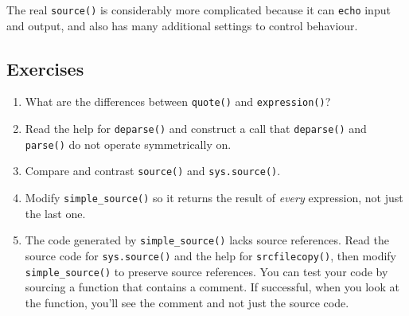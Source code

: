 \begin{Shaded}
\begin{Highlighting}[]
\StringTok{ } \NormalTok{()) \{}
  \NormalTok{(}
  \NormalTok{(}

\StringTok{ } \NormalTok{)}
\StringTok{ }\NormalTok{(}

\StringTok{ }
  \OperatorTok{==}\StringTok{ }\NormalTok{(}\NormalTok{())}

   \OperatorTok{-}\StringTok{ }\NormalTok{)) \{}
\NormalTok{  \}}
  \NormalTok{(}
\NormalTok{\}}
\end{Highlighting}
\end{Shaded}

The real \texttt{source()} is considerably more complicated because it
can \texttt{echo} input and output, and also has many additional
settings to control behaviour.

\hypertarget{exercises-5}{%
\subsection{Exercises}\label{exercises-5}}

\begin{enumerate}
\def\labelenumi{\arabic{enumi}.}
\item
  What are the differences between \texttt{quote()} and
  \texttt{expression()}?
\item
  Read the help for \texttt{deparse()} and construct a call that
  \texttt{deparse()} and \texttt{parse()} do not operate symmetrically
  on.
\item
  Compare and contrast \texttt{source()} and \texttt{sys.source()}.
\item
  Modify \texttt{simple\_source()} so it returns the result of
  \emph{every} expression, not just the last one.
\item
  The code generated by \texttt{simple\_source()} lacks source
  references. Read the source code for \texttt{sys.source()} and the
  help for \texttt{srcfilecopy()}, then modify \texttt{simple\_source()}
  to preserve source references. You can test your code by sourcing a
  function that contains a comment. If successful, when you look at the
  function, you'll see the comment and not just the source code.
\end{enumerate}

